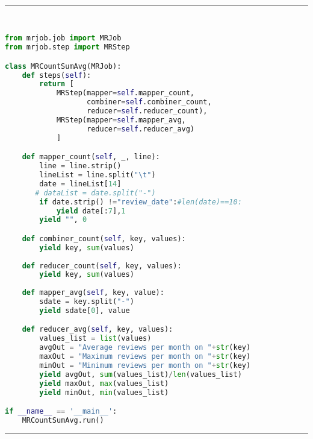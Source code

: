 \rule{200 pt}{0.5 pt} 

\renewcommand{\lstlistingname}{Code}
\lstset{style=mystyle}
\begin{lstlisting}[language=Python, caption={Average Number of Reviews per Month During Each Year}, label={lst:avgRev}, mathescape = true, breaklines=true]


from mrjob.job import MRJob
from mrjob.step import MRStep

class MRCountSumAvg(MRJob):
    def steps(self):
        return [
            MRStep(mapper=self.mapper_count,
                   combiner=self.combiner_count,
                   reducer=self.reducer_count),
            MRStep(mapper=self.mapper_avg,
                   reducer=self.reducer_avg)
            ]

    def mapper_count(self, _, line):
        line = line.strip()  
        lineList = line.split("\t")
        date = lineList[14]
       # dataList = date.split("-")
        if date.strip() !="review_date":#len(date)==10:
            yield date[:7],1
        yield "", 0

    def combiner_count(self, key, values):
        yield key, sum(values)
        
    def reducer_count(self, key, values):
        yield key, sum(values)
        
    def mapper_avg(self, key, value):
        sdate = key.split("-")
        yield sdate[0], value

    def reducer_avg(self, key, values):
        values_list = list(values)
        avgOut = "Average reviews per month on "+str(key)
        maxOut = "Maximum reviews per month on "+str(key)
        minOut = "Minimum reviews per month on "+str(key)
        yield avgOut, sum(values_list)/len(values_list)
        yield maxOut, max(values_list)
        yield minOut, min(values_list)

if __name__ == '__main__':
    MRCountSumAvg.run()
\end{lstlisting}

\rule{200 pt}{0.5 pt} 

